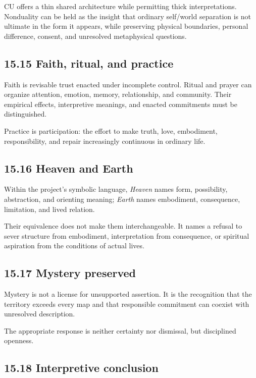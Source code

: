 \documentclass[
  11pt,
]{article}
\begin{document}
CU offers a thin shared architecture while permitting thick
interpretations. Nonduality can be held as the insight that ordinary
self/world separation is not ultimate in the form it appears, while
preserving physical boundaries, personal difference, consent, and
unresolved metaphysical questions.

\subsection{15.15 Faith, ritual, and
practice}\label{faith-ritual-and-practice}

Faith is revisable trust enacted under incomplete control. Ritual and
prayer can organize attention, emotion, memory, relationship, and
community. Their empirical effects, interpretive meanings, and enacted
commitments must be distinguished.

Practice is participation: the effort to make truth, love, embodiment,
responsibility, and repair increasingly continuous in ordinary life.

\subsection{15.16 Heaven and Earth}\label{heaven-and-earth}

Within the project's symbolic language, \emph{Heaven} names form,
possibility, abstraction, and orienting meaning; \emph{Earth} names
embodiment, consequence, limitation, and lived relation.

Their equivalence does not make them interchangeable. It names a refusal
to sever structure from embodiment, interpretation from consequence, or
spiritual aspiration from the conditions of actual lives.

\subsection{15.17 Mystery preserved}\label{mystery-preserved}

Mystery is not a license for unsupported assertion. It is the
recognition that the territory exceeds every map and that responsible
commitment can coexist with unresolved description.

The appropriate response is neither certainty nor dismissal, but
disciplined openness.

\subsection{15.18 Interpretive
conclusion}\label{interpretive-conclusion}
\end{document}

